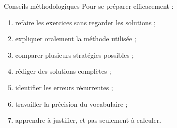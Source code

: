 \documentclass[11pt,a4paper]{article}
\begin{document}
\begin{cadreorange}{Conseils méthodologiques}
Pour se préparer efficacement :
\begin{enumerate}
    \item refaire les exercices sans regarder les solutions ;
    \item expliquer oralement la méthode utilisée ;
    \item comparer plusieurs stratégies possibles ;
    \item rédiger des solutions complètes ;
    \item identifier les erreurs récurrentes ;
    \item travailler la précision du vocabulaire ;
    \item apprendre à justifier, et pas seulement à calculer.
\end{enumerate}
\end{cadreorange}
\end{document}

